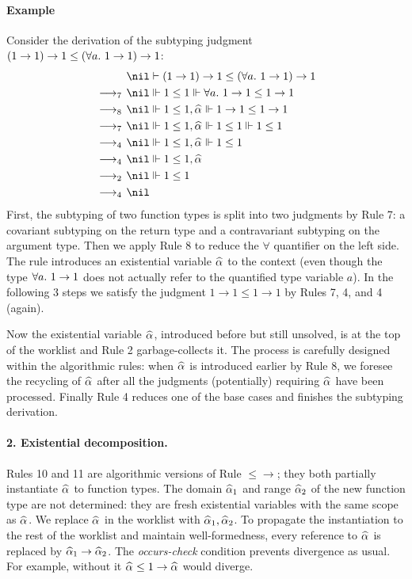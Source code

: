 \paragraph{Example} Consider the derivation of the subtyping judgment
$(1\to 1)\to 1 \le (\all 1\to 1) \to 1$:
\begin{gather*}
\begin{aligned}
  & \nil\vdash (1\to 1)\to 1 \le (\all 1 \to 1) \to 1\\
\rrule{7}  & \nil \Vdash 1 \le 1 \Vdash \all 1 \to 1 \le 1 \to 1\\
\rrule{8}  & \nil \Vdash 1 \le 1 ,\al \Vdash 1 \to 1 \le 1 \to 1\\
\rrule{7}  & \nil \Vdash 1 \le 1 ,\al \Vdash 1 \le 1 \Vdash 1 \le 1\\
\rrule{4} & \nil \Vdash 1 \le 1 ,\al \Vdash 1 \le 1\\
\rrule{4} & \nil \Vdash 1 \le 1 ,\al\\
\rrule{2} & \nil \Vdash 1 \le 1\\
\rrule{4} & \nil
\end{aligned}
\end{gather*}
First, the subtyping of two function types is split into two judgments by Rule 7:
a covariant subtyping on the return type and a contravariant subtyping on the argument type.
Then we apply Rule 8 to reduce the $\forall$ quantifier on the left side.
The rule introduces an existential variable $\al$ to the context (even though 
the type $\all 1 \to 1$ does not actually refer to the quantified type
variable $a$).
In the following 3 steps we satisfy the judgment $1 \to 1 \le 1 \to 1$
by Rules 7, 4, and 4 (again).

Now the existential variable $\al$, introduced before but still unsolved,
is at the top of the worklist and Rule 2 garbage-collects it.
The process is carefully designed within the algorithmic rules:
when $\al$ is introduced earlier by Rule 8,
we foresee the recycling of $\al$ after all the judgments (potentially)
requiring $\al$ have been processed.
Finally Rule 4 reduces one of the base cases and finishes the subtyping derivation.

\paragraph{\bf 2. Existential decomposition.}
Rules 10 and 11 are algorithmic versions of Rule $\mathtt{{\le}{\to}}$; they
both partially instantiate $\al$ to function types.
The domain $\al[1]$ and range $\al[2]$ of
the new function type are not determined:
they are fresh existential variables with the same scope as $\al$.
We replace $\al$ in the worklist with  $\al[1], \al[2]$.
To propagate the instantiation to the rest of the worklist and maintain well-formedness,
every reference to $\al$ is replaced by $\al[1] \to \al[2]$.
The \emph{occurs-check} condition prevents divergence as usual.
For example, without it $\al \le 1 \to \al$ would diverge.

